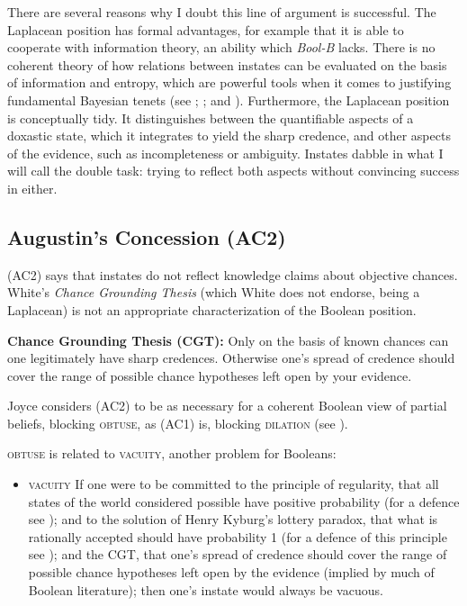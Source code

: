 \documentclass[11pt]{article}
\newcommand{\augustin}[0]{\textit{Bool-B}}
\begin{document}
There are several reasons why I doubt this line of argument is
successful. The Laplacean position has formal advantages, for example
that it is able to cooperate with information theory, an ability which
{\augustin} lacks. There is no coherent theory of how relations
between instates can be evaluated on the basis of information and
entropy, which are powerful tools when it comes to justifying
fundamental Bayesian tenets (see ;
; and ). Furthermore, the
Laplacean position is conceptually tidy. It distinguishes between the
quantifiable aspects of a doxastic state, which it integrates to yield
the sharp credence, and other aspects of the evidence, such as
incompleteness or ambiguity. Instates dabble in what I will call the
double task: trying to reflect both aspects without convincing success
in either. 

\subsection{Augustin's Concession (AC2)}
\label{jj2}

(AC2) says that instates do not reflect knowledge claims about
objective chances. White's \emph{Chance Grounding Thesis} (which White
does not endorse, being a Laplacean) is not an appropriate
characterization of the Boolean position.

\begin{quotex}
  \textbf{Chance Grounding Thesis (CGT):} Only on the basis of known
  chances can one legitimately have sharp credences. Otherwise one's
  spread of credence should cover the range of possible chance
  hypotheses left open by your evidence.
\end{quotex}

Joyce considers (AC2) to be as necessary for a coherent Boolean view
of partial beliefs, blocking \textsc{obtuse}, as (AC1) is, blocking
\textsc{dilation} (see ). 

\textsc{obtuse} is related to \textsc{vacuity}, another problem for
Booleans:

\begin{itemize}
\item \textsc{vacuity} If one were to be committed to the principle of
  regularity, that all states of the world considered possible have
  positive probability (for a defence see
  ); and to the solution of Henry
  Kyburg's lottery paradox, that what is rationally accepted should
  have probability 1 (for a defence of this principle see
  ); and the CGT, that one's spread of
  credence should cover the range of possible chance hypotheses left
  open by the evidence (implied by much of Boolean literature); then
  one's instate would always be vacuous.
\end{itemize}
\end{document}
